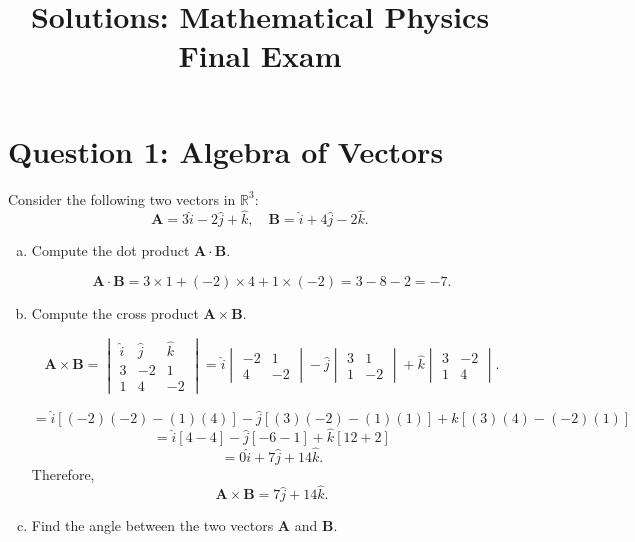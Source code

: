 \documentclass{article}
\begin{document}
\title{Solutions: Mathematical Physics Final Exam}
\author{}
\date{}
\maketitle

\section*{Question 1: Algebra of Vectors}

Consider the following two vectors in \( \mathbb{R}^3 \):
\[
\mathbf{A} = 3\hat{i} - 2\hat{j} + \hat{k}, \quad \mathbf{B} = \hat{i} + 4\hat{j} - 2\hat{k}.
\]

\begin{enumerate}[a)]
  \item Compute the dot product \( \mathbf{A} \cdot \mathbf{B} \).
  
  \[
  \mathbf{A} \cdot \mathbf{B} = 3 \times 1 + (-2) \times 4 + 1 \times (-2) = 3 - 8 - 2 = -7.
  \]

  \item Compute the cross product \( \mathbf{A} \times \mathbf{B} \).
  
  \[
  \mathbf{A} \times \mathbf{B} = \begin{vmatrix} \hat{i} & \hat{j} & \hat{k} \\ 3 & -2 & 1 \\ 1 & 4 & -2 \end{vmatrix}
  = \hat{i} \begin{vmatrix} -2 & 1 \\ 4 & -2 \end{vmatrix} - \hat{j} \begin{vmatrix} 3 & 1 \\ 1 & -2 \end{vmatrix} + \hat{k} \begin{vmatrix} 3 & -2 \\ 1 & 4 \end{vmatrix}.
  \]
  
  \[
  = \hat{i} \left[ (-2)(-2) - (1)(4) \right] - \hat{j} \left[ (3)(-2) - (1)(1) \right] + \hat{k} \left[ (3)(4) - (-2)(1) \right]
  \]
  \[
  = \hat{i} \left[ 4 - 4 \right] - \hat{j} \left[ -6 - 1 \right] + \hat{k} \left[ 12 + 2 \right]
  \]
  \[
  = 0\hat{i} + 7\hat{j} + 14\hat{k}.
  \]
  Therefore, 
  \[
  \mathbf{A} \times \mathbf{B} = 7\hat{j} + 14\hat{k}.
  \]

  \item Find the angle between the two vectors \( \mathbf{A} \) and \( \mathbf{B} \).


\end{enumerate}
\end{document}
